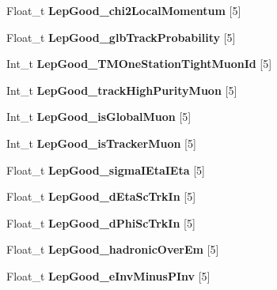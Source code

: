 \begin{DoxyCompactItemize}
Float\+\_\+t {\bfseries Lep\+Good\+\_\+chi2\+Local\+Momentum} \mbox{[}5\mbox{]}
\item 
\hypertarget{classMiniTree_a38827f0d7199f754c8397b314cec50e2}{}\label{classMiniTree_a38827f0d7199f754c8397b314cec50e2} 
Float\+\_\+t {\bfseries Lep\+Good\+\_\+glb\+Track\+Probability} \mbox{[}5\mbox{]}
\item 
\hypertarget{classMiniTree_a8c884123da91de9d630b6fd9e92ea829}{}\label{classMiniTree_a8c884123da91de9d630b6fd9e92ea829} 
Int\+\_\+t {\bfseries Lep\+Good\+\_\+\+T\+M\+One\+Station\+Tight\+Muon\+Id} \mbox{[}5\mbox{]}
\item 
\hypertarget{classMiniTree_a3f34714b21ac89e5036d55ee16e221f2}{}\label{classMiniTree_a3f34714b21ac89e5036d55ee16e221f2} 
Int\+\_\+t {\bfseries Lep\+Good\+\_\+track\+High\+Purity\+Muon} \mbox{[}5\mbox{]}
\item 
\hypertarget{classMiniTree_a361da82082c07f33f3a25be1ea5f1e75}{}\label{classMiniTree_a361da82082c07f33f3a25be1ea5f1e75} 
Int\+\_\+t {\bfseries Lep\+Good\+\_\+is\+Global\+Muon} \mbox{[}5\mbox{]}
\item 
\hypertarget{classMiniTree_aa22a8a952ee80e1891dc1252ea19a684}{}\label{classMiniTree_aa22a8a952ee80e1891dc1252ea19a684} 
Int\+\_\+t {\bfseries Lep\+Good\+\_\+is\+Tracker\+Muon} \mbox{[}5\mbox{]}
\item 
\hypertarget{classMiniTree_a46cb3b90a2c88e9fe28e7170455aa504}{}\label{classMiniTree_a46cb3b90a2c88e9fe28e7170455aa504} 
Float\+\_\+t {\bfseries Lep\+Good\+\_\+sigma\+I\+Eta\+I\+Eta} \mbox{[}5\mbox{]}
\item 
\hypertarget{classMiniTree_a886551600df4b45639fb18778defac93}{}\label{classMiniTree_a886551600df4b45639fb18778defac93} 
Float\+\_\+t {\bfseries Lep\+Good\+\_\+d\+Eta\+Sc\+Trk\+In} \mbox{[}5\mbox{]}
\item 
\hypertarget{classMiniTree_af031124dce8d72f00872fed1df15ea01}{}\label{classMiniTree_af031124dce8d72f00872fed1df15ea01} 
Float\+\_\+t {\bfseries Lep\+Good\+\_\+d\+Phi\+Sc\+Trk\+In} \mbox{[}5\mbox{]}
\item 
\hypertarget{classMiniTree_a90b912d0f5cb9a29cd0a30886dedf0d2}{}\label{classMiniTree_a90b912d0f5cb9a29cd0a30886dedf0d2} 
Float\+\_\+t {\bfseries Lep\+Good\+\_\+hadronic\+Over\+Em} \mbox{[}5\mbox{]}
\item 
\hypertarget{classMiniTree_a56ed05cb9b5b284b2c1b1989196591a7}{}\label{classMiniTree_a56ed05cb9b5b284b2c1b1989196591a7} 
Float\+\_\+t {\bfseries Lep\+Good\+\_\+e\+Inv\+Minus\+P\+Inv} \mbox{[}5\mbox{]}
\item 
\hypertarget{classMiniTree_a6cd7047f9318fd1687619560549a4f92}{}\label{classMiniTree_a6cd7047f9318fd1687619560549a4f92} 

\end{DoxyCompactItemize}
